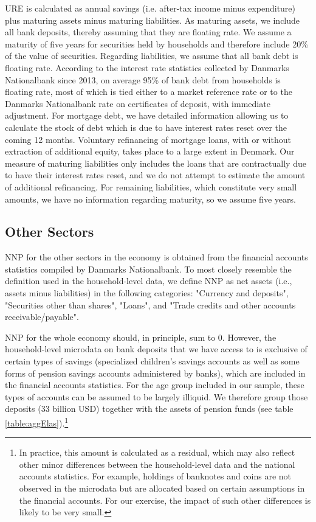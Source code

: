 \documentclass[titlepage]{\econtex}\newcommand{\texname}{ConsumptionHeterogeneity}
\begin{document}
URE is calculated as annual savings (i.e. after-tax income minus expenditure) plus maturing assets minus maturing liabilities. As maturing assets, we include all bank deposits, thereby assuming that they are floating rate. We assume a maturity of five years for securities held by households and therefore include 20\% of the value of securities. Regarding liabilities, we assume that all bank debt is floating rate. According to the interest rate statistics collected by Danmarks Nationalbank since 2013, on average 95\% of bank debt from households is floating rate, most of which is tied either to a market reference rate or to the Danmarks Nationalbank rate on certificates of deposit, with immediate adjustment. For mortgage debt, we have detailed information allowing us to calculate the stock of debt which is due to have interest rates reset over the coming 12 months. Voluntary refinancing of mortgage loans, with or without extraction of additional equity, takes place to a large extent in Denmark. Our measure of maturing liabilities only includes the loans that are contractually due to have their interest rates reset, and we do not attempt to estimate the amount of additional refinancing. For remaining liabilities, which constitute very small amounts, we have no information regarding maturity, so we assume five years. 

\subsection{Other Sectors}
NNP for the other sectors in the economy is obtained from the financial accounts statistics compiled by Danmarks Nationalbank. To most closely resemble the definition used in the household-level data, we define NNP as net assets (i.e., assets minus liabilities) in the following categories: "Currency and deposits", "Securities other than shares", "Loans", and "Trade credits and other accounts receivable/payable". 

NNP for the whole economy should, in principle, sum to 0. However, the household-level microdata on bank deposits that we have access to is exclusive of certain types of savings (specialized children's savings accounts as well as some forms of pension savings accounts administered by banks), which are included in the financial accounts statistics. For the age group included in our sample, these types of accounts can be assumed to be largely illiquid. We therefore group those deposits (33 billion USD) together with the assets of pension funds (see table \ref{table:aggElas}).\footnote{In practice, this amount is calculated as a residual, which may also reflect other minor differences between the household-level data and the national accounts statistics. For example, holdings of banknotes and coins are not observed in the microdata but are allocated based on certain assumptions in the financial accounts. For our exercise, the impact of such other differences is likely to be very small.}
\end{document}
